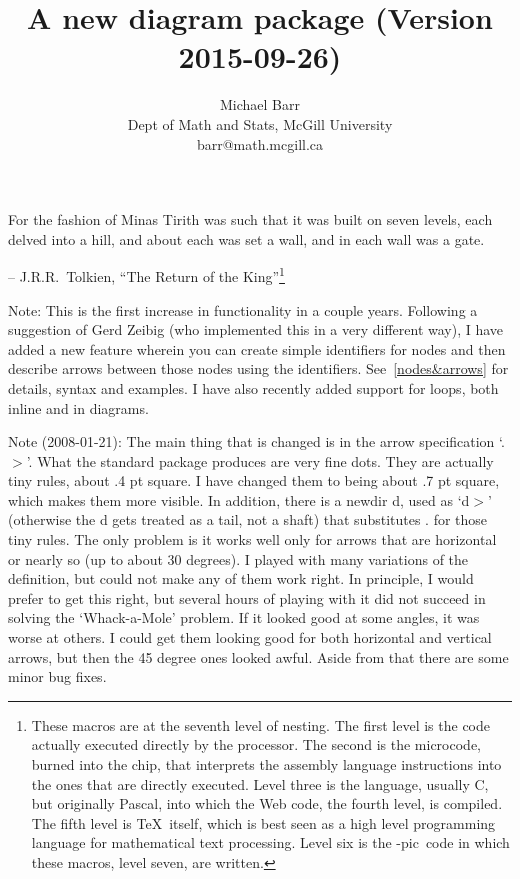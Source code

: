 \documentclass[12pt]{article}
\begin{document}
\def\xypic{\hbox{\rm\Xy-pic}}

\title{A new diagram package (Version 2015-09-26)}
\author{Michael Barr\\Dept of Math and Stats, McGill University
\\barr@math.mcgill.ca}
 \date{}
 \maketitle
\tableofcontents


\kern 40pt
{\narrower
For the fashion of Minas Tirith was such that it was built on seven levels,
each delved into a hill, and about each was set a wall, and in each wall
was a gate.

-- J.R.R.\ Tolkien, ``The Return of the King''\footnote{These macros are
at the seventh level of nesting.  The first level is the code actually
executed directly by the processor.  The second is the microcode, burned
into the chip, that interprets the assembly language instructions into
the ones that are directly executed.  Level three is the language,
usually C, but originally Pascal, into which the Web code, the fourth
level, is compiled.  The fifth level is \TeX\ itself, which is best seen
as a high level programming language for mathematical text processing.
Level six is the \xypic\ code in which these macros, level seven, are
written.}

}


\kern 5pt
 Note:  This is the first increase in functionality in a couple years.
Following a suggestion of Gerd Zeibig (who implemented this in a very
different way), I have added a new feature wherein you can create simple
identifiers for nodes and then describe arrows between those nodes using
the identifiers.  See~\ref{nodes&arrows} for details, syntax and
examples.  I have also recently added support for loops, both inline and
in diagrams.

Note (2008-01-21): The main thing that is changed is in the arrow
specification `.$>$'.  What the standard package produces are very fine
dots.  They are actually tiny rules, about .4 pt square.  I have changed
them to being about .7 pt square, which makes them more visible.  In
addition, there is a newdir {d}, used as `{}{d}$>$' (otherwise the {d}
gets treated as a tail, not a shaft) that substitutes . for those tiny
rules.  The only problem is it works well only for arrows that are
horizontal or nearly so (up to about 30 degrees).  I played with many
variations of the definition, but could not make any of them work right.
In principle, I would prefer to get this right, but several hours of
playing with it did not succeed in solving the `Whack-a-Mole' problem.
If it looked good at some angles, it was worse at others.  I could get
them looking good for both horizontal and vertical arrows, but then the
45 degree ones looked awful.  Aside from that there are some minor bug
fixes.
\end{document}

